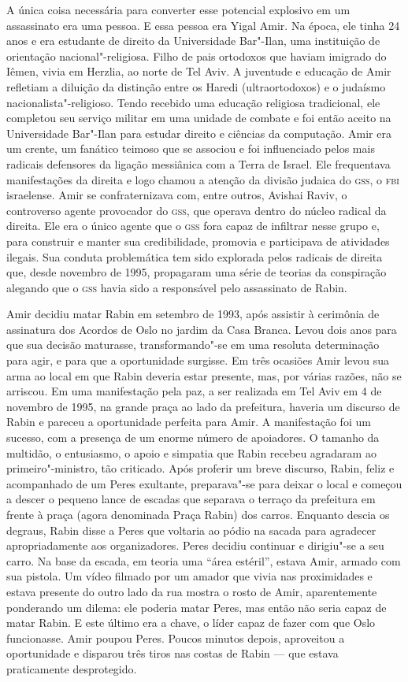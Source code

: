A única coisa necessária para converter esse potencial explosivo em um
assassinato era uma pessoa. E essa pessoa era Yigal Amir. Na época, ele
tinha 24 anos e era estudante de direito da Universidade
Bar"-Ilan, uma instituição de orientação nacional"-religiosa. Filho de
pais ortodoxos que haviam imigrado do Iêmen, vivia em Herzlia, ao
norte de Tel Aviv. A juventude e educação de Amir refletiam a diluição
da distinção entre os Haredi (ultraortodoxos) e o judaísmo
nacionalista"-religioso. Tendo recebido uma educação religiosa
tradicional, ele completou seu serviço militar em uma unidade de combate
e foi então aceito na Universidade Bar"-Ilan para estudar direito e
ciências da computação. Amir era um crente, um fanático teimoso que se
associou e foi influenciado pelos mais radicais defensores da ligação
messiânica com a Terra de Israel. Ele frequentava manifestações da
direita e logo chamou a atenção da divisão judaica do
\textsc{gss},  
o \textsc{fbi} israelense. Amir se confraternizava com, entre outros, Avishai Raviv, o controverso agente provocador do \textsc{gss}, que operava dentro do
núcleo radical da direita. Ele era o único agente que o \textsc{gss} fora capaz
de infiltrar nesse grupo e, para construir e manter sua credibilidade,
promovia e participava de atividades ilegais. Sua conduta problemática
tem sido explorada pelos radicais de direita que, desde novembro de
1995, propagaram uma série de teorias da conspiração alegando que o \textsc{gss}
havia sido a responsável pelo assassinato de Rabin.

Amir decidiu matar Rabin em setembro de 1993, após assistir à cerimônia
de assinatura dos Acordos de Oslo no jardim da Casa Branca. Levou dois
anos para que sua decisão maturasse, transformando"-se em uma resoluta
determinação para agir, e para que a oportunidade surgisse. Em três
ocasiões Amir levou sua arma ao local em que Rabin deveria estar
presente, mas, por várias razões, não se arriscou. Em uma manifestação pela
paz, a ser realizada em Tel Aviv em 4 de novembro de 1995, na grande
praça ao lado da prefeitura, haveria um discurso de Rabin e pareceu a
oportunidade perfeita para Amir. A manifestação foi um sucesso, com a
presença de um enorme número de apoiadores. O tamanho da multidão, o
entusiasmo, o apoio e simpatia que Rabin recebeu agradaram ao primeiro"-ministro,
tão criticado. Após proferir um breve discurso, Rabin, feliz e
acompanhado de um Peres exultante, preparava"-se para deixar o local e
começou a descer o pequeno lance de escadas que separava o terraço da
prefeitura em frente à praça (agora denominada Praça Rabin) dos carros.
Enquanto descia os degraus, Rabin disse a Peres que voltaria ao pódio na
sacada para agradecer apropriadamente aos organizadores. Peres decidiu
continuar e dirigiu"-se a seu carro. Na base da escada, em teoria uma
``área estéril'', estava Amir, armado com sua pistola. Um vídeo filmado
por um amador que vivia nas proximidades e estava presente do outro lado da rua 
mostra o rosto de Amir, aparentemente ponderando um dilema: ele poderia
matar Peres, mas então não seria capaz de matar Rabin. E este último era a
chave, o líder capaz de fazer com que Oslo funcionasse. Amir poupou
Peres. Poucos minutos depois, aproveitou a oportunidade e disparou três
tiros nas costas de Rabin --- que estava praticamente desprotegido.

